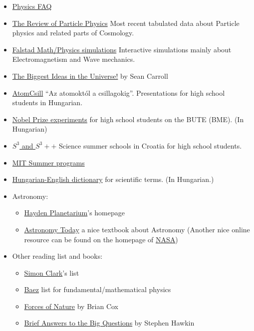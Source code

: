 \documentclass{article}
\begin{document}
\begin{itemize}
\item \href{https://math.ucr.edu/home/baez/physics/index.html}{Physics FAQ}

\item \href{http://pdg.lbl.gov/}{The Review of Particle Physics} Most recent tabulated data about Particle physics and related parts of Cosmology.

\item \href{https://www.falstad.com/mathphysics.html}{Falstad Math/Physics simulations} Interactive simulations mainly about Electromagnetism and Wave mechanics.


\item \href{https://www.youtube.com/playlist?list=PLrxfgDEc2NxZJcWcrxH3jyjUUrJlnoyzX}{The Biggest Ideas in the Universe!} by Sean Carroll 

\item \href{http://atomcsill.elte.hu/}{AtomCsill} ``Az atomoktól a csillagokig''. Presentations for high school students in Hungarian.

\item \href{http://felvi.physics.bme.hu/nobeldijas}{Nobel Prize experiments} for high school students on the BUTE (BME). (In Hungarian)

\item \href{https://drustvo-evo.hr/s3/}{$S^3$ and $S^3++$} Science summer schools in Croatia for high school students.

\item \href{https://mitadmissions.org/apply/prepare/summer/}{MIT Summer programs}

\item \href{http://cuhs.co.uk/wp-content/uploads/2011/12/Szakszavak.pdf}{Hungarian-English dictionary} for scientific terms. (In Hungarian.)

\item Astronomy:
\begin{itemize}
    \item \href{https://www.haydenplanetarium.org/}{Hayden Planetarium}'s homepage
    \item \href{https://www.goodreads.com/book/show/23512.Astronomy_Today}{Astronomy Today} a nice textbook about Astronomy (Another nice online resource can be found on the homepage of \href{https://solarsystem.nasa.gov/basics/}{NASA})
\end{itemize}

\item Other reading list and books:

\begin{itemize}
    \item \href{https://www.youtube.com/watch?v=p9s2fBYA4fU}{Simon Clark}'s list
    \item \href{http://math.ucr.edu/home/baez/books.html}{Baez} list for fundamental/mathematical physics
    \item \href{https://www.goodreads.com/book/show/30359599-forces-of-nature}{Forces of Nature} by Brian Cox
    \item \href{https://www.goodreads.com/book/show/40277241-brief-answers-to-the-big-questions}{Brief Answers to the Big Questions} by Stephen Hawkin
\end{itemize}



\end{itemize}
\end{document}
